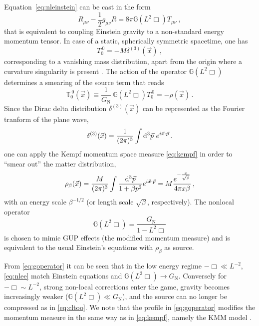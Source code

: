 %
Equation~\eqref{eq:nleinstein} can be cast in the form
\begin{equation}\label{eq:nlee}
R_{\mu\nu} - \frac{1}{2} g_{\mu\nu} R = 8 \pi \mathbb{G}(L^2\Box) T_{\mu\nu}~,
\end{equation}
that is equivalent to coupling Einstein gravity to a non-standard energy
momentum tensor. In case of a static, spherically symmetric spacetime, one has
\begin{equation}
\label{eq:cltoo}
T^{\ 0}_0=-M \delta^{(3)}(\vec{x}) ~, %
\end{equation}
corresponding to a vanishing mass distribution, apart from the origin where
a curvature singularity is present \cite{BaN93,BaN94,DeB08}. The action of
the operator $\mathbb{G}(L^2\Box)$ determines a smearing of the source
term that reads
\begin{equation}
\mathbb{T}^{\ 0}_0(\vec{x})\equiv\frac{1}{G_\mathrm{N}} \ \mathbb{G}(L^2\Box) T^{\ 0}_0  = -\rho(\vec{x}) \,.
\end{equation}
Since the Dirac delta distribution $\delta^{(3)}(\vec{x})$ can be represented
as the Fourier tranform of the plane wave,
\begin{equation}
    \delta^{(3)}(\vec{x}) = \frac{1}{(2\pi)^{3}}\int \mathrm{d}^3\vec{p}\ e^{i 
    \vec{x}\cdot\vec{p}} \,.
    \label{eq:delta}
\end{equation}
one can apply the Kempf momentum space measure \eqref{eq:kempf} in order
to ``smear out'' the matter distribution,
\begin{equation}
    \rho_\beta(\vec{x}) = \frac{M}{(2\pi)^{3}}\int 
    \frac{\mathrm{d}^3\vec{p}}{1+\beta p^2}  e^{i \vec{x}\cdot\vec{p}}=
    M \frac{e^{-\frac{x}{\sqrt{\beta}}}}{4\pi x \beta} \,,
    \label{eq:smeared}
\end{equation}
with an energy scale $\beta^{-1/2}$ (or length scale $\sqrt{\beta}$,
respectively). The nonlocal operator
\begin{equation}
\label{eq:goperator}
\mathbb{G}(L^2\Box) = \frac{G_\mathrm{N}}{1 - L^2 \Box}
\end{equation}
is chosen to mimic GUP effects (the modified momentum measure) and is
equivalent to the usual Einstein's equations  with $\rho_\beta$ as source.

From \eqref{eq:goperator} it can be seen that in the low energy regime
$-\Box\ll L^{-2}$, \eqref{eq:nlee} match Einstein equations and
$\mathbb{G}(L^2\Box) \to G_\mathrm{N}$. Conversely for $-\Box\sim L^{-2}$,
strong non-local corrections enter the game, gravity becomes increasingly
weaker ($\mathbb{G}(L^2\Box) \ll G_\mathrm{N}$), and the source can no
longer be compressed as in \eqref{eq:cltoo}. We note that the profile
in \eqref{eq:goperator} modifies the momentum measure in the same way
as in \eqref{eq:kempf}, namely the KMM model \cite{KMM95}.

